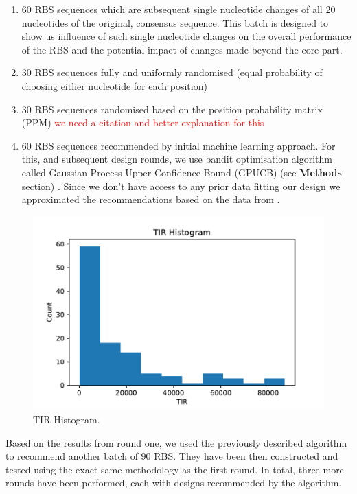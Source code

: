 \documentclass{article}
\begin{document}
\begin{enumerate}
    \item 60 RBS sequences which are subsequent single nucleotide changes of all 20 nucleotides of the original, consensus sequence. This batch is designed to show us influence of such single nucleotide changes on the overall performance of the RBS and the potential impact of changes made beyond the core part.
    \item 30 RBS sequences fully and uniformly randomised (equal probability of choosing either nucleotide for each position) 
    \item 30 RBS sequences randomised based on the position probability matrix (PPM) \textcolor{red}{we need a citation and better explanation for this}  
    \item 60 RBS sequences recommended by initial machine learning approach. For this, and subsequent design rounds, we use bandit optimisation algorithm called Gaussian Process Upper Confidence Bound (GPUCB) (see \textbf{Methods} section) \cite{srinivas2012information}. Since we don't have access to any prior data fitting our design we approximated the recommendations based on the data from \textcite{jervis2018machine}. 
\end{enumerate}{}

\begin{figure}[t]
    \centering
    \includegraphics[scale=0.7]{plots/TIR_histogram.pdf}
    \caption{TIR Histogram.}
    \label{fig: TIR Histogram.}
\end{figure}

Based on the results from round one, we used the previously described algorithm to recommend another batch of 90 RBS. They have been then constructed and tested using the exact same methodology as the first round. In total, three more rounds have been performed, each with designs recommended by the algorithm. 
\end{document}
